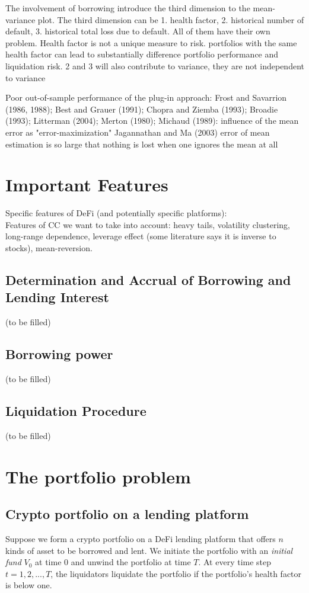 \documentclass{article} %
\theoremstyle{plain}
\theoremstyle{definition} %
\begin{document}
The involvement of borrowing introduce the third dimension to the mean-variance plot. 
 The third dimension can be 1. health factor, 2. historical number of default, 3. historical total loss due to default. 
 All of them have their own problem.
 Health factor is not a unique measure to risk. portfolios with the same health factor can lead to substantially difference portfolio performance and liquidation risk.
 2 and 3 will also contribute to variance, they are not independent to variance

Poor out-of-sample performance of the plug-in approach: Frost and Savarrion (1986, 1988); Best and Grauer (1991); Chopra and Ziemba (1993); Broadie (1993); 
Litterman (2004); Merton (1980); 
Michaud (1989): influence of the mean error as "error-maximization"
Jagannathan and Ma (2003) error of mean estimation is so large that nothing is lost when one ignores the mean at all


\section{Important Features}
Specific features of DeFi (and potentially specific platforms):\\
Features of CC we want to take into account: heavy tails, volatility clustering, long-range dependence, leverage effect (some literature says it is inverse to stocks), mean-reversion.

\subsection{Determination and Accrual of Borrowing and Lending Interest}
(to be filled)
\subsection{Borrowing power}
(to be filled)
\subsection{Liquidation Procedure}
(to be filled)


\section{The portfolio problem}
\subsection{Crypto portfolio on a lending platform}
Suppose we form a crypto portfolio on a DeFi lending platform that offers $n$ kinds of asset to be borrowed and lent. 
 We initiate the portfolio with an \textit{initial fund} $V_0$ at time $0$ and unwind the portfolio at time $T$.
 At every time step $t=1,2,...,T$, the liquidators liquidate the portfolio if the portfolio's health factor is below one.\\
\end{document}
